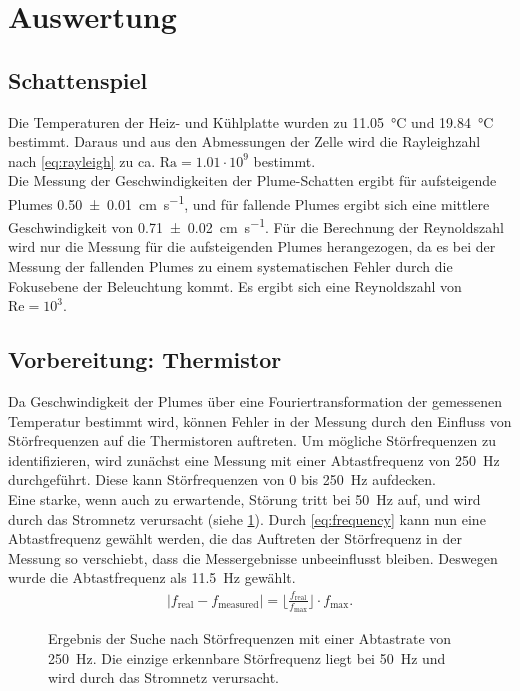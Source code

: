 \section{Auswertung}
\subsection{Schattenspiel}
Die Temperaturen der Heiz- und Kühlplatte wurden zu \SI{11.05}{\celsius} und \SI{19.84}{\celsius} bestimmt. Daraus und aus den Abmessungen der Zelle wird die Rayleighzahl nach \cref{eq:rayleigh} zu ca. $\text{Ra} = 1.01\cdot 10^{9}$ bestimmt.
\\
Die Messung der Geschwindigkeiten der Plume-Schatten ergibt für aufsteigende Plumes \SI{0.50\pm0.01}{\centi\meter\per\second}, und für fallende Plumes ergibt sich eine mittlere Geschwindigkeit von \SI{0.71\pm0.02}{\centi\meter\per\second}.
Für die Berechnung der Reynoldszahl wird nur die Messung für die aufsteigenden Plumes herangezogen, da es bei der Messung der fallenden Plumes zu einem systematischen Fehler durch die Fokusebene der Beleuchtung kommt. Es ergibt sich eine Reynoldszahl von $\text{Re}=10^{3}$.
\\ %

\subsection{Vorbereitung: Thermistor}
Da Geschwindigkeit der Plumes über eine Fouriertransformation der gemessenen Temperatur bestimmt wird, können Fehler in der Messung durch den Einfluss von Störfrequenzen auf die Thermistoren auftreten.
Um mögliche Störfrequenzen zu identifizieren, wird zunächst eine Messung mit einer Abtastfrequenz von \SI{250}{\hertz} durchgeführt. 
Diese kann Störfrequenzen von 0 bis \SI{250}{\hertz} aufdecken.
\\
Eine starke, wenn auch zu erwartende, Störung tritt bei \SI{50}{\hertz} auf, und wird durch das Stromnetz verursacht (siehe \cref{fig:stoer}).
Durch \cref{eq:frequency} kann nun eine Abtastfrequenz gewählt werden, die das Auftreten der Störfrequenz in der Messung so verschiebt, dass die Messergebnisse unbeeinflusst bleiben. Deswegen wurde die Abtastfrequenz als \SI{11.5}{\hertz} gewählt.
\begin{align}
	|f_{\text{real}}- f_{\text{measured}} | = \lfloor\frac{f_{\text{real}}}{f_{\text{max}}}\rfloor \cdot f_{\text{max}}. \label{eq:frequency}
\end{align}
\begin{figure}
	\caption{Ergebnis der Suche nach Störfrequenzen mit einer Abtastrate von \SI{250}{\hertz}. Die einzige erkennbare Störfrequenz liegt bei \SI{50}{\hertz} und wird durch das Stromnetz verursacht.}\label{fig:stoer}
\end{figure}
\\

